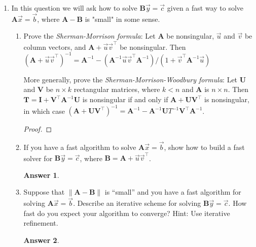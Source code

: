 \documentclass{article}
\theoremstyle{definition}
\newtheorem*{answer}{Answer}
\newcommand{\mat}[1]{\bm{#1}}
\begin{document}
\begin{enumerate}[leftmargin=\labelsep]
	\item In this question we will ask how to solve \(\mat{B}\vec{y} = \vec{c}\) given a fast way to solve \(\mat{A}\vec{x} = \vec{b}\), where \(\mat{A} - \mat{B}\) is "small" in some sense.
	      \begin{enumerate}
		      \item Prove the \emph{Sherman-Morrison formula}: Let \(\mat{A}\) be nonsingular, \(\vec{u}\) and \(\vec{v}\) be column vectors, and \(\mat{A} + \vec{u}\vec{v}^\top\) be nonsingular. Then \((\mat{A} + \vec{u}\vec{v}^\top)^{-1} = \mat{A}^{-1} - (\mat{A}^{-1}\vec{u}\vec{v}^\top\mat{A}^{-1})/(1 + \vec{v}^\top \mat{A}^{-1} \vec{u})\)

		            More generally, prove the \emph{Sherman-Morrison-Woodbury formula}: Let \(\mat{U}\) and \(\mat{V}\) be \(n \times k\) rectangular matrices, where \(k < n\) and \(\mat{A}\) is \(n \times n\). Then \(\mat{T} = \mat{I} + \mat{V}^\top \mat{A}^{-1} \mat{U}\) is nonsingular if and only if \(\mat{A} + \mat{U}\mat{V}^\top\) is nonsingular, in which case \((\mat{A} + \mat{U}\mat{V}^\top )^{-1} = \mat{A}^{-1} - \mat{A}^{-1} \mat{U}T^{-1} \mat{V}^\top \mat{A}^{-1}\).
		            \begin{proof}

		            \end{proof}

		      \item If you have a fast algorithm to solve \(\mat{A}\vec{x} = \vec{b}\), show how to build a fast solver for \(\mat{B}\vec{y} = \vec{c}\), where \(\mat{B} = \mat{A} + \vec{u}\vec{v}^\top\).
		            \begin{answer}

		            \end{answer}

		      \item Suppose that \(\|\mat{A}-\mat{B}\|\) is ``small'' and you have a fast algorithm for solving \(\mat{A}\vec{x} = \vec{b}\). Describe an iterative scheme for solving \(\mat{B}\vec{y} = \vec{c}\). How fast do you expect your algorithm to converge? Hint: Use iterative refinement.
		            \begin{answer}

		            \end{answer}
	      \end{enumerate}


\end{enumerate}
\end{document}
